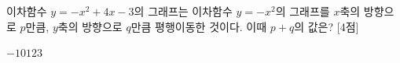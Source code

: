 이차함수 $y=-x^2+4x-3$의 그래프는 이차함수 $y=-x^2$의 그래프를 $x$축의 방향으로 $p$만큼, $y$축의 방향으로 $q$만큼 평행이동한 것이다. 이때 $p+q$의 값은? \mbox{[4점]}
\begin{choices32}{$-1$}{$0$}{$1$}{$2$}{$3$}\end{choices32}

